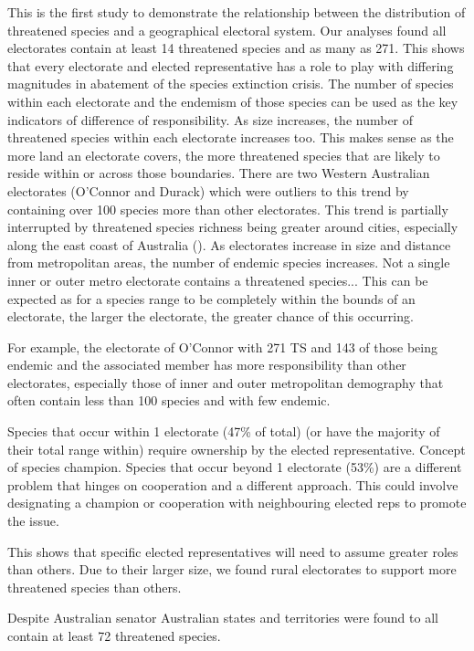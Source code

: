 \documentclass[a4paper,11pt]{article}
\begin{document}
This is the first study to demonstrate the relationship between the distribution of threatened species and a geographical electoral system. Our analyses found all electorates contain at least 14 threatened species and as many as 271. This shows that every electorate and elected representative has a role to play with differing magnitudes in abatement of the species extinction crisis. The number of species within each electorate and the endemism of those species can be used as the key indicators of difference of responsibility.
As size increases, the number of threatened species within each electorate increases too. This makes sense as the more land an electorate covers, the more threatened species that are likely to reside within or across those boundaries. There are two Western Australian electorates (O'Connor and Durack) which were outliers to this trend by containing over 100 species more than other electorates. This trend is partially interrupted by threatened species richness being greater around cities, especially along the east coast of Australia (\cite{ivesCitiesAreHotspots2016}).
As electorates increase in size and distance from metropolitan areas, the number of endemic species increases. Not a single inner or outer metro electorate contains a threatened species...
This can be expected as for a species range to be completely within the bounds of an electorate, the larger the electorate, the greater chance of this occurring.

For example, the electorate of O'Connor with 271 TS and 143 of those being endemic and the associated member has more responsibility than other electorates, especially those of inner and outer metropolitan demography that often contain less than 100 species and with few endemic.

Species that occur within 1 electorate (47\% of total) (or have the majority of their total range within) require ownership by the elected representative. Concept of species champion.
Species that occur beyond 1 electorate (53\%) are a different problem that hinges on cooperation and a different approach. This could involve designating a champion or cooperation with neighbouring elected reps to promote the issue.


This shows that specific elected representatives will need to assume greater roles than others.
Due to their larger size, we found rural electorates to support more threatened species than others.


Despite Australian senator Australian states and territories were found to all contain at least 72 threatened species.
\end{document}
